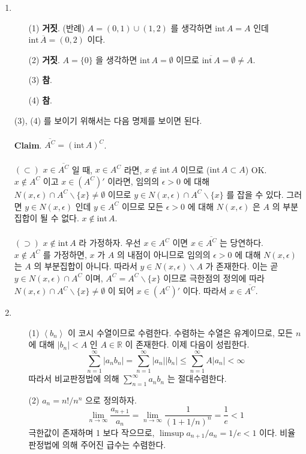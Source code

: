 \documentclass[12pt]{report}
\newcommand{\numl}[1]{\item[\large\textbf{\sffamily #1.}]}
\renewcommand{\span}[1]{\left\langle #1 \right\rangle}
\newcommand{\ra}{\rightarrow}
\newcommand{\abs}[1]{\left|#1\right|}
\newcommand{\inte}{\mathrm{int}\,}
\newcommand{\bs}{\backslash}
\newcommand{\R}{\mathbb{R}}
\begin{document}
\begin{enumerate}
\numl{2}
\begin{enumerate}
	\item[(1)] \textbf{거짓}. (반례) $A = (0, 1)\cup (1, 2)$ 를 생각하면 $\inte A = A$ 인데 $\inte\overline{A} = (0, 2)$ 이다.
	\item[(2)] \textbf{거짓}. $A = \{0\}$ 을 생각하면 $\inte A = \emptyset$ 이므로 $\overline{\inte A} = \emptyset \neq A$. 
	\item[(3)] \textbf{참}.
	\item[(4)] \textbf{참}.
\end{enumerate}
(3), (4) 를 보이기 위해서는 다음 명제를 보이면 된다.\\
\\
\textbf{Claim}. $\overline{A^C} = (\inte A)^C$.\\
\\
$(\subset)$ $x\in \overline{A^C}$ 일 때, $x\in A^C$ 라면, $x\notin \inte A$ 이므로 ($\inte A \subset A$) OK.\\
$x\notin A^C$ 이고 $x\in (A^C)'$ 이라면, 임의의 $\epsilon>0$ 에 대해 $N(x, \epsilon) \cap A^C \bs \{x\}\neq \emptyset$ 이므로 $y\in N(x, \epsilon) \cap A^C \bs \{x\}$ 를 잡을 수 있다. 그러면 $y\in N(x, \epsilon)$ 인데 $y\in A^C$ 이므로 모든 $\epsilon>0$ 에 대해 $N(x, \epsilon)$ 은 $A$ 의 부분집합이 될 수 없다. $x\notin \inte A$.\\
\\
$(\supset)$ $x\notin \inte A$ 라 가정하자. 우선 $x\in A^C$ 이면 $x\in \overline{A^C}$ 는 당연하다.\\
$x\notin A^C$ 를 가정하면, $x$ 가 $A$ 의 내점이 아니므로 임의의 $\epsilon>0$ 에 대해 $N(x,\epsilon)$ 는 $A$ 의 부분집합이 아니다. 따라서 $y\in N(x, \epsilon) \bs A$ 가 존재한다. 이는 곧 $y\in N(x, \epsilon) \cap A^C$ 이며, $A^C = A^C \bs \{x\}$ 이므로 극한점의 정의에 따라 $N(x, \epsilon) \cap A^C\bs \{x\} \neq \emptyset$ 이 되어 $x\in (A^C)'$ 이다. 따라서 $x\in \overline{A^C}$. 

\numl{3}
\begin{enumerate}
	\item[(1)] $\span{b_n}$ 이 코시 수열이므로 수렴한다. 수렴하는 수열은 유계이므로, 모든 $n$ 에 대해 $\abs{b_n} < A$ 인 $A\in\R$ 이 존재한다. 이제 다음이 성립한다.
	$$\sum_{n=1}^\infty \abs{a_nb_n} = \sum_{n=1}^\infty \abs{a_n}\abs{b_n}\leq \sum_{n=1}^\infty A\abs{a_n} < \infty$$
	따라서 비교판정법에 의해 $\sum_{n=1}^\infty a_nb_n$ 는 절대수렴한다.
	\item[(2)] $a_n = n!/n^n$ 으로 정의하자.
	$$\lim_{n\ra\infty} \frac{a_{n+1}}{a_n} = \lim_{n\ra\infty} \frac{1}{(1+1/n)^n} = \frac{1}{e} < 1$$
	극한값이 존재하며 1 보다 작으므로, $\limsup a_{n+1}/a_n = 1/e < 1$ 이다. 비율판정법에 의해 주어진 급수는 수렴한다.
\end{enumerate}


\end{enumerate}
\end{document}
